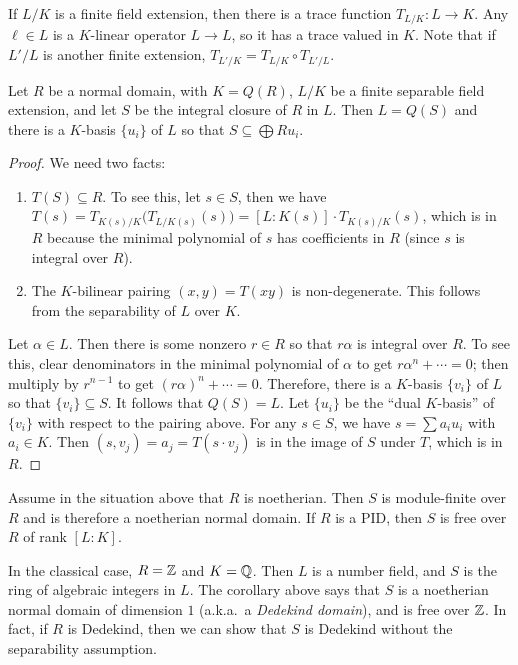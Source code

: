  \setcounter{lecture}{29}

 If $L/K$ is a finite field extension, then there is a trace function $T_{L/K}:L\to K$.
 Any $\ell\in L$ is a $K$-linear operator $L\to L$, so it has a trace valued in $K$. Note
 that if $L'/L$ is another finite extension, $T_{L'/K}= T_{L/K} \circ T_{L'/L}$.
 \begin{theorem}
   Let $R$ be a normal domain, with $K=Q(R)$, $L/K$ be a finite separable field
   extension, and let $S$ be the integral closure of $R$ in $L$. Then $L=Q(S)$ and there
   is a $K$-basis $\{u_i\}$ of $L$ so that $S\subseteq \bigoplus Ru_i$.
 \end{theorem}
 \begin{proof}
   We need two facts:
   \begin{enumerate}
     \item $T(S)\subseteq R$. To see this, let $s\in S$, then we have $T(s)=T_{K(s)/K}
     \bigl( T_{L/K(s)}(s)\bigr) = [L:K(s)] \cdot T_{K(s)/K}(s)$, which is in $R$ because
     the minimal polynomial of $s$ has coefficients in $R$ (since $s$ is integral over
     $R$).

     \item The $K$-bilinear pairing $(x,y) = T(xy)$ is non-degenerate. This follows from
     the separability of $L$ over $K$.
   \end{enumerate}
   Let $\alpha\in L$. Then there is some nonzero $r\in R$ so that $r\alpha$ is
   integral over $R$. To see this, clear denominators in the minimal polynomial of
   $\alpha$ to get $r\alpha^n + \cdots =0$; then multiply by $r^{n-1}$ to get
   $(r\alpha)^n+\cdots = 0$. Therefore, there is a $K$-basis $\{v_i\}$ of $L$ so that
   $\{v_i\}\subseteq S$. It follows that $Q(S)=L$. Let $\{u_i\}$ be the ``dual
   $K$-basis'' of $\{v_i\}$ with respect to the pairing above. For any $s\in S$, we
   have $s = \sum a_i u_i$ with $a_i\in K$. Then $(s,v_j)=a_j = T(s\cdot v_j)$ is in the
   image of $S$ under $T$, which is in $R$.
 \end{proof}
 \begin{corollary}
   Assume in the situation above that $R$ is noetherian. Then $S$ is module-finite over
   $R$ and is therefore a noetherian normal domain. If $R$ is a PID, then $S$ is free
   over $R$ of rank $[L:K]$.
 \end{corollary}
 In the classical case, $R=\mathbb{Z}$ and $K=\mathbb{Q}$. Then $L$ is a number field, and $S$ is the
 ring of algebraic integers in $L$. The corollary above says that $S$ is a noetherian
 normal domain of dimension $1$ (a.k.a.~a \emph{Dedekind domain}), and is free over
 $\mathbb{Z}$. In fact, if $R$ is Dedekind, then we can show that $S$ is Dedekind without the
 separability assumption.

